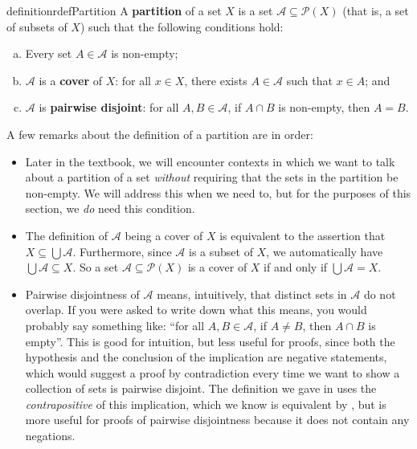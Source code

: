 \begin{restatable}{definition}{rdefPartition}
\label{defPartition}
A \textbf{partition} of a set $X$ is a set $\mathcal{A} \subseteq \mathcal{P}(X)$ (that is, a set of subsets of $X$) such that the following conditions hold:
\begin{enumerate}[(a)]
\item Every set $A \in \mathcal{A}$ is non-empty;
\item $\mathcal{A}$ is a \textbf{cover} of $X$: for all $x \in X$, there exists $A \in \mathcal{A}$ such that $x \in A$; and
\item $\mathcal{A}$ is \textbf{pairwise disjoint}: for all $A,B \in \mathcal{A}$, if $A \cap B$ is non-empty, then $A=B$.
\end{enumerate}
\end{restatable}

A few remarks about the definition of a partition are in order:
\begin{itemize}
\item Later in the textbook, we will encounter contexts in which we want to talk about a partition of a set \textit{without} requiring that the sets in the partition be non-empty. We will address this when we need to, but for the purposes of this section, we \textit{do} need this condition.
\item The definition of $\mathcal{A}$ being a cover of $X$ is equivalent to the assertion that $X \subseteq \bigcup \mathcal{A}$. Furthermore, since $\mathcal{A}$ is a subset of $X$, we automatically have $\bigcup \mathcal{A} \subseteq X$. So a set $\mathcal{A} \subseteq \mathcal{P}(X)$ is a cover of $X$ if and only if $\bigcup \mathcal{A} = X$.
\item Pairwise disjointness of $\mathcal{A}$ means, intuitively, that distinct sets in $\mathcal{A}$ do not overlap. If you were asked to write down what this means, you would probably say something like: ``for all $A, B \in \mathcal{A}$, if $A \ne B$, then $A \cap B$ is empty''. This is good for intuition, but less useful for proofs, since both the hypothesis and the conclusion of the implication are negative statements, which would suggest a proof by contradiction every time we want to show a collection of sets is pairwise disjoint. The definition we gave in  uses the \textit{contrapositive} of this implication, which we know is equivalent by , but is more useful for proofs of pairwise disjointness because it does not contain any negations.
\end{itemize}

